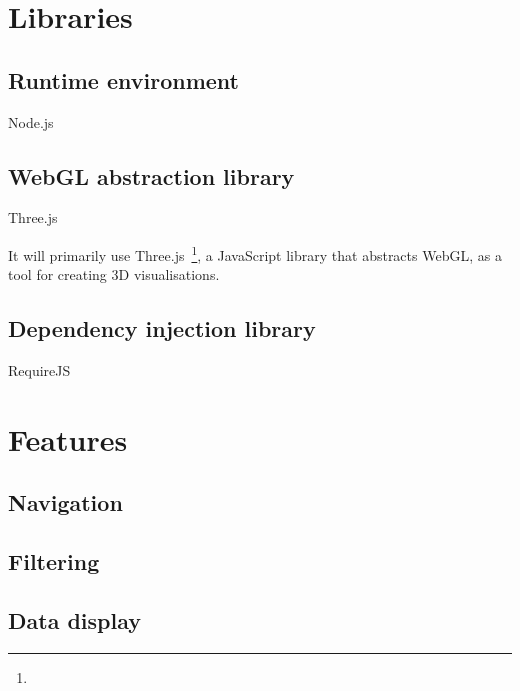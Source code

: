 \section{Libraries} {
	
	\subsection{Runtime environment} {
	
		Node.js

	}

	\subsection{WebGL abstraction library} {
		
		Three.js

		It will primarily use Three.js~\footnote{}, a JavaScript library that abstracts WebGL, as a tool for creating 3D visualisations. 

	}

	\subsection{Dependency injection library} {
		
		RequireJS

	}

}

\section{Features} {
	
	\subsection{Navigation} {


	}

	\subsection{Filtering} {

	}

	\subsection{Data display} {


	}

}